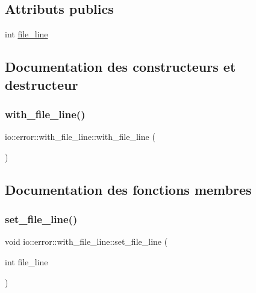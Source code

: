 \subsection*{Attributs publics}
\begin{DoxyCompactItemize}
\item 
int \hyperlink{structio_1_1error_1_1with__file__line_a391298c37172bcdb83aeb3daf65d5a0e}{file\+\_\+line}
\end{DoxyCompactItemize}


\subsection{Documentation des constructeurs et destructeur}
\mbox{\label{structio_1_1error_1_1with__file__line_a742ad5e6a169a7972c908f606a28ab4e}} 
\subsubsection{\texorpdfstring{with\+\_\+file\+\_\+line()}{with\_file\_line()}}
{\footnotesize\ttfamily io\+::error\+::with\+\_\+file\+\_\+line\+::with\+\_\+file\+\_\+line (\begin{DoxyParamCaption}{ }\end{DoxyParamCaption})\hspace{0.3cm}{\ttfamily [inline]}}



\subsection{Documentation des fonctions membres}
\mbox{\label{structio_1_1error_1_1with__file__line_aa92778a81778abc676ec6ee9952bba8c}} 
\subsubsection{\texorpdfstring{set\+\_\+file\+\_\+line()}{set\_file\_line()}}
{\footnotesize\ttfamily void io\+::error\+::with\+\_\+file\+\_\+line\+::set\+\_\+file\+\_\+line (\begin{DoxyParamCaption}\item[{int}]{file\+\_\+line }\end{DoxyParamCaption})\hspace{0.3cm}{\ttfamily [inline]}}



